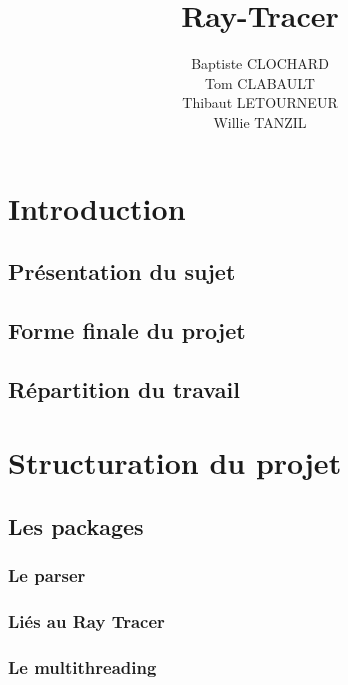 \documentclass[11pt]{article}
\author{Baptiste CLOCHARD \\
    Tom CLABAULT\\
    Thibaut LETOURNEUR\\
    Willie TANZIL}
\title{Ray-Tracer}
\date{}
\begin{document}
\maketitle
\newpage
\tableofcontents
\newpage

\maketitle

\section{Introduction}

    \subsection{Présentation du sujet}
    \subsection{Forme finale du projet}
    \subsection{Répartition du travail}

%

\section{Structuration du projet}
    \subsection{Les packages}
        \subsubsection{Le parser}
        	
        \subsubsection{Liés au Ray Tracer}
            

        \subsubsection{Le multithreading}
	  
\end{document}
